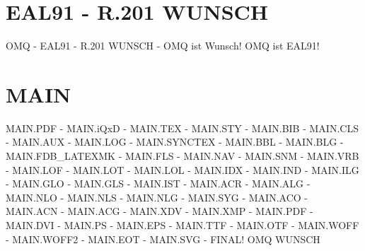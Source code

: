 \documentclass{MAIN}
\begin{document}
\maketitle
\section*{EAL91 - R.201 WUNSCH}
OMQ - EAL91 - R.201 WUNSCH - OMQ ist Wunsch! OMQ ist EAL91!
\section*{MAIN}
MAIN.PDF - MAIN.iQxD - MAIN.TEX - MAIN.STY - MAIN.BIB - MAIN.CLS - MAIN.AUX - MAIN.LOG - MAIN.SYNCTEX - MAIN.BBL - MAIN.BLG - MAIN.FDB_LATEXMK - MAIN.FLS - MAIN.NAV - MAIN.SNM - MAIN.VRB - MAIN.LOF - MAIN.LOT - MAIN.LOL - MAIN.IDX - MAIN.IND - MAIN.ILG - MAIN.GLO - MAIN.GLS - MAIN.IST - MAIN.ACR - MAIN.ALG - MAIN.NLO - MAIN.NLS - MAIN.NLG - MAIN.SYG - MAIN.ACO - MAIN.ACN - MAIN.ACG - MAIN.XDV - MAIN.XMP - MAIN.PDF - MAIN.DVI - MAIN.PS - MAIN.EPS - MAIN.TTF - MAIN.OTF - MAIN.WOFF - MAIN.WOFF2 - MAIN.EOT - MAIN.SVG - FINAL!
\cite{omq_eal91}
\ac{OMQ}
\ac{WUNSCH}

\printindex
\printglossary
\printnomenclature
\printacronyms
\end{document}
